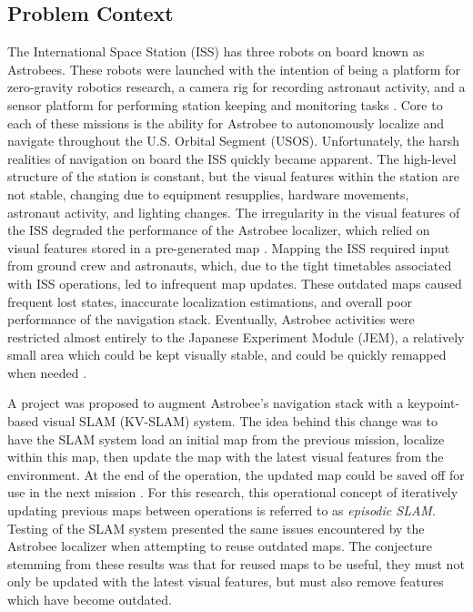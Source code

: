 \subsection{Problem Context}

The International Space Station (ISS) has three robots on board known as Astrobees. These robots were launched with the intention of being a platform for zero-gravity robotics research, a camera rig for recording astronaut activity, and a sensor platform for performing station keeping and monitoring tasks \cite{smithASTROBEENEWPLATFORM}. Core to each of these missions is the ability for Astrobee to autonomously localize and navigate throughout the U.S. Orbital Segment (USOS). Unfortunately, the harsh realities of navigation on board the ISS quickly became apparent. The high-level structure of the station is constant, but the visual features within the station are not stable, changing due to equipment resupplies, hardware movements, astronaut activity, and lighting changes. The irregularity in the visual features of the ISS degraded the performance of the Astrobee localizer, which relied on visual features stored in a pre-generated map \cite{soussanAstroLocEfficientRobust2022}. Mapping the ISS required input from ground crew and astronauts, which, due to the tight timetables associated with ISS operations, led to infrequent map updates. These outdated maps caused frequent lost states, inaccurate localization estimations, and overall poor performance of the navigation stack. Eventually, Astrobee activities were restricted almost entirely to the Japanese Experiment Module (JEM), a relatively small area which could be kept visually stable, and could be quickly remapped when needed \cite{carlinoLessonsLearnedAstrobee}.

A project was proposed to augment Astrobee's navigation stack with a keypoint-based visual SLAM (KV-SLAM) system. The idea behind this change was to have the SLAM system load an initial map from the previous mission, localize within this map, then update the map with the latest visual features from the environment. At the end of the operation, the updated map could be saved off for use in the next mission \cite{zuralesCollaborativeSensingMapping2024}. For this research, this operational concept of iteratively updating previous maps between operations is referred to as \textit{episodic SLAM}. Testing of the SLAM system presented the same issues encountered by the Astrobee localizer when attempting to reuse outdated maps. The conjecture stemming from these results was that for reused maps to be useful, they must not only be updated with the latest visual features, but must also remove features which have become outdated.

